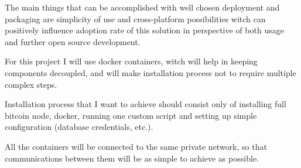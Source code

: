 \documentclass[12pt, en, eng]{mgr}
\begin{document}
The main things that can be accomplished with well chosen deployment and packaging are simplicity of use and cross-platform possibilities witch can positively influence adoption rate of this solution in perspective of both usage and further open source development.

For this project I will use docker containers, witch will help in keeping components decoupled, and will make installation process not to require multiple complex steps. 

Installation process that I want to achieve should consist only of installing full bitcoin node, docker, running one custom script and setting up simple configuration (database credentials, etc.).

All the containers will be connected to the same private network, so that communications between them will be as simple to achieve as possible.
\end{document}
